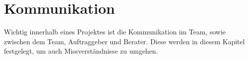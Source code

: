 \section{Kommunikation}
Wichtig innerhalb eines Projektes ist die Kommunikation im Team, sowie zwischen dem Team, Auftraggeber und Berater. Diese werden in diesem Kapitel festgelegt, um auch Missverständnisse zu umgehen.